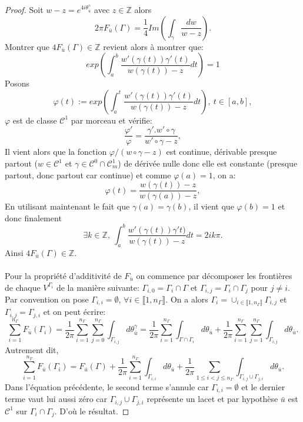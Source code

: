 \begin{proof}
    Soit $w-z=e^{4i\theta_{\bar{u}}^\gamma}$ avec $z\in\mathbb{Z}$ alors
    $$
    2\pi F_{\bar{u}}(\Gamma)=\frac{1}{4}Im\left(\int_\gamma\frac{dw}{w-z}\right).
    $$
    Montrer que $4F_{\bar{u}}(\Gamma)\in\mathbb{Z}$ revient alors à montrer que:
    $$
    exp\left(\int_a^b\frac{w'(\gamma(t))\gamma'(t)}{w(\gamma(t))-z}dt\right)=1
    $$
    Posons
    $$
    \varphi(t):=exp\left(\int_a^t\frac{w'(\gamma(t))\gamma'(t)}{w(\gamma(t))-z}dt\right),~t\in[a,b],
    $$
    $\varphi$ est de classe $\mathcal{C}^1$ par morceau et vérifie:
    $$
    \frac{\varphi'}{\varphi}=\frac{\gamma'.w'\circ\gamma}{w'\circ\gamma-z},
    $$
    Il vient alors que la fonction $\varphi/(w\circ\gamma-z)$ est continue, dérivable presque partout ($w\in\mathcal{C}^1$ et $\gamma\in\mathcal{C}^0\cap\mathcal{C}^1_m$) de dérivée nulle donc elle est constante (presque partout, donc partout car continue) et comme $\varphi(a)=1$, on a:
    $$
    \varphi(t)=\frac{w(\gamma(t))-z}{w(\gamma(a))-z},
    $$
    En utilisant maintenant le fait que $\gamma(a)=\gamma(b)$, il vient que $\varphi(b)=1$ et donc finalement
    $$
    \exists k\in\mathbb{Z},~\int_a^b\frac{w'(\gamma(t))\gamma't)}{w(\gamma(t))-z}dt=2ik\pi.
    $$
    Ainsi $4F_{\bar{u}}(\Gamma)\in\mathbb{Z}$.\\\\
    Pour la propriété d'additivité de $F_{\bar{u}}$ on commence par décomposer les frontières de chaque $V^{\Gamma_i}$ de la manière suivante: $\Gamma_{i,0}=\Gamma_i\cap\Gamma$ et $\Gamma_{i,j}=\Gamma_i\cap\Gamma_j$ pour $j\neq i$. Par convention on pose $\Gamma_{i,i}=\emptyset$, $\forall i\in\llbracket 1, n_\Gamma\rrbracket$. On a alors $\Gamma_i=\cup_{i\in\llbracket1, n_\Gamma\rrbracket}\Gamma_{i,j}$ et $\Gamma_{i,j}=\Gamma_{j,i}$ et on peut écrire:
    $$
    \sum_{i=1}^{n_\Gamma}F_{\bar{u}}(\Gamma_i)=\frac{1}{2\pi}\sum_{i=1}^{n_\Gamma}\sum_{j=0}^{n_\Gamma}\int_{\Gamma_{i,j}}d\theta_{\bar{u}}^\gamma=\frac{1}{2\pi}\sum_{i=1}^{n_\Gamma}\int_{\Gamma\cap\Gamma_i}d\theta_{\bar{u}}+\frac{1}{2\pi}\sum_{i=1}^{n_\Gamma}\sum_{j=1}^{n_\Gamma}\int_{\Gamma_{i,j}}d\theta_{\bar{u}}.
    $$
    Autrement dit,
    $$
    \sum_{i=1}^{n_\Gamma}F_{\bar{u}}(\Gamma_i)=F_{\bar{u}}(\Gamma)+\frac{1}{2\pi}\sum_{i=1}^{n_\Gamma}\int_{\Gamma_{i,i}}d\theta_{\bar{u}}+\frac{1}{2\pi}\sum_{1\leq i<j\leq n_\Gamma}\int_{\Gamma_{i,j}\cup\Gamma_{j,i}}d\theta_{\bar{u}}.
    $$
    Dans l'équation précédente, le second terme s'annule car $\Gamma_{i,i}=\emptyset$ et le dernier terme vaut lui aussi zéro car $\Gamma_{i,j}\cup\Gamma_{j,i}$ représente un lacet et par hypothèse $\bar{u}$ est $\mathcal{C}^1$ sur $\Gamma_i\cap\Gamma_j$. D'où le résultat.
\end{proof}

